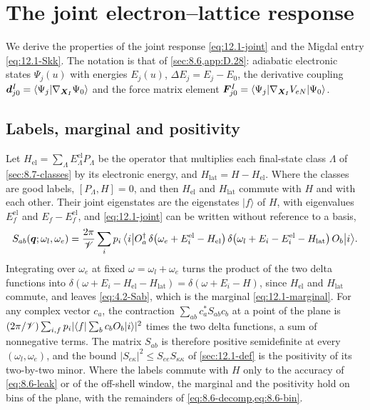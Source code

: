 \section{The joint electron--lattice response}\label{app:D.33}

We derive the properties of the joint response \cref{eq:12.1-joint} and the Migdal entry \cref{eq:12.1-Skk}. The notation is that of \cref{sec:8.6,app:D.28}: adiabatic electronic states $\Psi_j(u)$ with energies $E_j(u)$, $\Delta E_j = E_j - E_0$, the derivative coupling $\bm{d}^I_{j0} = \langle\Psi_j|\nabla_{\bm{X}_I}\Psi_0\rangle$ and the force matrix element $\bm{F}^I_{j0} = \langle\Psi_j|\nabla_{\bm{X}_I}V_{eN}|\Psi_0\rangle$.

\subsection{Labels, marginal and positivity}\label{app:D.33-labels}

Let $H_{\mathrm{el}} = \sum_\Lambda E^{\mathrm{el}}_\Lambda P_\Lambda$ be the operator that multiplies each final-state class $\Lambda$ of \cref{sec:8.7-classes} by its electronic energy, and $H_{\mathrm{lat}} = H - H_{\mathrm{el}}$. Where the classes are good labels, $[P_\Lambda, H] = 0$, and then $H_{\mathrm{el}}$ and $H_{\mathrm{lat}}$ commute with $H$ and with each other. Their joint eigenstates are the eigenstates $|f\rangle$ of $H$, with eigenvalues $E^{\mathrm{el}}_f$ and $E_f - E^{\mathrm{el}}_f$, and \cref{eq:12.1-joint} can be written without reference to a basis,
\begin{equation*}
  S_{ab}(\bm{q};\omega_l,\omega_e) = \frac{2\pi}{\mathscr{V}}\sum_ip_i\,\bigl\langle i\big|O_a^\dagger\,\delta\bigl(\omega_e + E^{\mathrm{el}}_i - H_{\mathrm{el}}\bigr)\,\delta\bigl(\omega_l + E_i - E^{\mathrm{el}}_i - H_{\mathrm{lat}}\bigr)\,O_b\big|i\bigr\rangle .
\end{equation*}
Integrating over $\omega_e$ at fixed $\omega = \omega_l + \omega_e$ turns the product of the two delta functions into $\delta(\omega + E_i - H_{\mathrm{el}} - H_{\mathrm{lat}}) = \delta(\omega + E_i - H)$, since $H_{\mathrm{el}}$ and $H_{\mathrm{lat}}$ commute, and leaves \cref{eq:4.2-Sab}, which is the marginal \cref{eq:12.1-marginal}. For any complex vector $c_a$, the contraction $\sum_{ab}c_a^*S_{ab}c_b$ at a point of the plane is $(2\pi/\mathscr{V})\sum_{i,f}p_i|\langle f|\sum_bc_bO_b|i\rangle|^2$ times the two delta functions, a sum of nonnegative terms. The matrix $S_{ab}$ is therefore positive semidefinite at every $(\omega_l, \omega_e)$, and the bound $|S_{e\kappa}|^2 \le S_{ee}S_{\kappa\kappa}$ of \cref{sec:12.1-def} is the positivity of its two-by-two minor. Where the labels commute with $H$ only to the accuracy of \cref{eq:8.6-leak} or of the off-shell window, the marginal and the positivity hold on bins of the plane, with the remainders of \cref{eq:8.6-decomp,eq:8.6-bin}.

